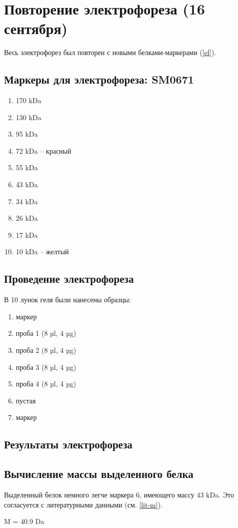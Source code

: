\section{Повторение электрофореза (16 сентября)}

Весь электрофорез был повторен с новыми белками-маркерами (\ref{ef}).

\subsection{Маркеры для электрофореза: SM0671}
\begin{enumerate}
\item 170 kDa
\item 130 kDa
\item 95 kDa
\item 72 kDa -- красный
\item 55 kDa
\item 43 kDa
\item 34 kDa
\item 26 kDa
\item 17 kDa
\item 10 kDa -- желтый
\end{enumerate}

\subsection{Проведение электрофореза}
В 10 лунок геля были нанесены образцы:
\begin{enumerate}
\item маркер
\item проба 1 (8 µl, 4 µg)
\item проба 2 (8 µl, 4 µg)
\item проба 3 (8 µl, 4 µg)
\item проба 4 (8 µl, 4 µg)
\item пустая
\item маркер
\end{enumerate}


\subsection{Результаты электрофореза}
\def\svgwidth{0.7\linewidth}

\subsection{Вычисление массы выделенного белка}
Выделенный белок немного легче маркера 6, имеющего массу 43 kDa.
Это согласуется с литературными данными (см. \ref{lit-m}).



M = 40.9 Da

